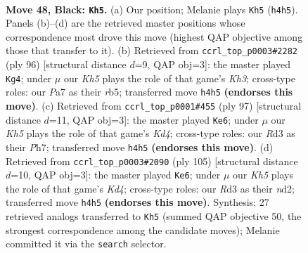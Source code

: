 \documentclass[11pt]{article}
\begin{document}
\clearpage

\begin{figure}[p]\centering
\begin{subfigure}{0.46\textwidth}\centering
\resizebox{\linewidth}{!}{%
\newchessgame
\chessboard[
  setfen={8/p2p4/2p5/4K3/5P1k/3r4/8/8 b - - 0 48},
  showmover=false,
  pgfstyle=straightmove, color=movearrow, markmove={h4-h5}
]}
\caption{}
\end{subfigure}\hfill
\begin{subfigure}{0.46\textwidth}\centering
\resizebox{\linewidth}{!}{%
\newchessgame
\chessboard[
  setfen={8/6p1/5k2/1r6/5P2/4R1PK/8/8 w - - 3 49},
  showmover=false,
  pgfstyle=straightmove, color=movearrow, markmove={h3-g4}
]}
\caption{}
\end{subfigure}
\\[4pt]
\begin{subfigure}{0.46\textwidth}\centering
\resizebox{\linewidth}{!}{%
\newchessgame
\chessboard[
  setfen={8/7p/6p1/3k4/5K1P/6P1/8/8 b - - 3 49},
  showmover=false,
  pgfstyle=straightmove, color=movearrow, markmove={d5-e6}
]}
\caption{}
\end{subfigure}\hfill
\begin{subfigure}{0.46\textwidth}\centering
\resizebox{\linewidth}{!}{%
\newchessgame
\chessboard[
  setfen={8/8/7p/3kpp2/8/6K1/3N3P/8 b - - 13 53},
  showmover=false,
  pgfstyle=straightmove, color=movearrow, markmove={d5-e6}
]}
\caption{}
\end{subfigure}
\caption{\textbf{Move 48, Black: \texttt{Kh5}.} (a) Our position; Melanie plays \texttt{Kh5} (\texttt{h4h5}). Panels (b)--(d) are the retrieved master positions whose correspondence most drove this move (highest QAP objective among those that transfer to it). (b) Retrieved from \texttt{ccrl\_top\_p0003\#2282} (ply 96) [structural distance $d$=9, QAP obj=3]: the master played \texttt{Kg4}; under $\mu$ our \emph{Kh5} plays the role of that game's \emph{Kh3}; cross-type roles: our \emph{P}a7 as their \emph{r}b5; transferred move \texttt{h4h5} \textbf{(endorses this move)}. (c) Retrieved from \texttt{ccrl\_top\_p0001\#455} (ply 97) [structural distance $d$=11, QAP obj=3]: the master played \texttt{Ke6}; under $\mu$ our \emph{Kh5} plays the role of that game's \emph{Kd4}; cross-type roles: our \emph{R}d3 as their \emph{P}h7; transferred move \texttt{h4h5} \textbf{(endorses this move)}. (d) Retrieved from \texttt{ccrl\_top\_p0003\#2090} (ply 105) [structural distance $d$=10, QAP obj=3]: the master played \texttt{Ke6}; under $\mu$ our \emph{Kh5} plays the role of that game's \emph{Kd4}; cross-type roles: our \emph{R}d3 as their \emph{n}d2; transferred move \texttt{h4h5} \textbf{(endorses this move)}. Synthesis: 27 retrieved analogs transferred to \texttt{Kh5} (summed QAP objective 50, the strongest correspondence among the candidate moves); Melanie committed it via the \texttt{search} selector.}
\label{fig:thought-m95}
\end{figure}
\end{document}
